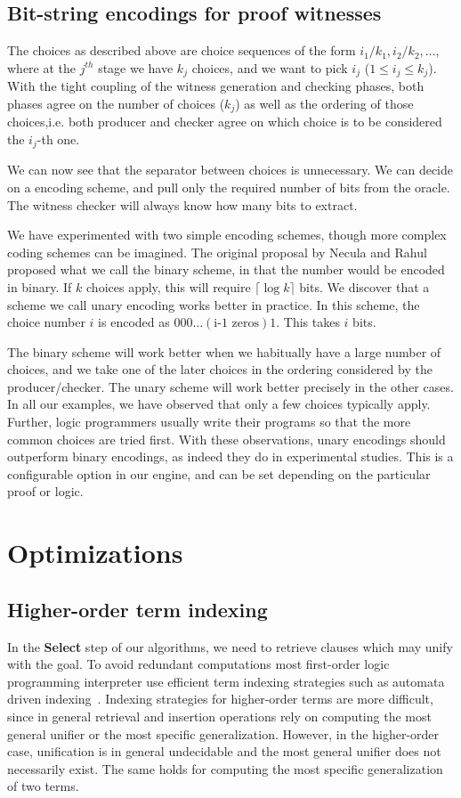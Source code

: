 \documentclass{llncs}
\begin{document}
\subsection{Bit-string encodings for proof witnesses}

The choices as described above are choice sequences of the form
$i_1/k_1,i_2/k_2,\ldots$, where at the $j^{th}$ stage we have $k_j$
choices, and we want to pick $i_j$ ($1 \leq i_j \leq k_j$). With the
tight coupling of the witness generation and checking phases, both
phases agree on the number of choices ($k_j$) as well as the ordering
of those choices,i.e. both producer and checker agree on which
choice is to be considered the $i_j$-th one.

We can now see that the separator between choices is unnecessary. We
can decide on a encoding scheme, and pull only the required number of
bits from the oracle. The witness checker will always know how many
bits to extract.

We have experimented with two simple encoding schemes, though more
complex coding schemes can be imagined. The original proposal by
Necula and Rahul proposed what we call the binary scheme, in that the
number would be encoded in binary. If $k$ choices apply, this will
require $\lceil\log k\rceil$ bits. We discover that a scheme we call
unary encoding works better in practice. In this scheme, the choice
number $i$ is encoded as $0 0 0 \ldots (\mbox{i-1 zeros}) 1$. This
takes $i$ bits.

The binary scheme will work better when we habitually have a large
number of choices, and we take one of the later choices in the
ordering considered by the producer/checker. The unary scheme will
work better precisely in the other cases. In all our examples, we have
observed that only a few choices typically apply. Further, logic
programmers usually write their programs so that the more common
choices are tried first. With these observations, unary encodings
should outperform binary encodings, as indeed they do in experimental
studies. This is a configurable option in our engine, and can be set
depending on the particular proof or logic.

\section{Optimizations}
\subsection{Higher-order term indexing}\label{sec:indexing}
In the {\bf Select} step of our algorithms, we need to retrieve
clauses which may unify with the goal. To avoid redundant computations
most first-order logic programming interpreter use efficient term 
indexing strategies such as automata driven
indexing~\cite{Ramakrishnan01:indexing}. Indexing strategies for
higher-order terms are more difficult, since in general retrieval and
insertion operations rely on computing the most general unifier or the
most specific generalization. However, in the higher-order case,
unification is in general undecidable and the most general unifier
does not necessarily exist. The same holds for computing the most
specific generalization of two terms.
\end{document}
